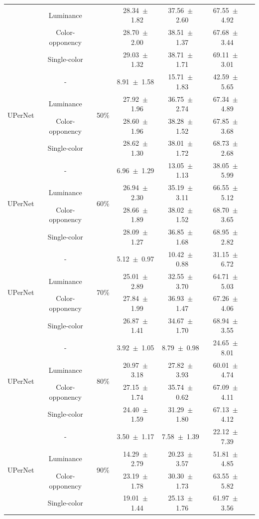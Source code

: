 \begin{table}[h]
\begin{tabular}{@{}lccc ccc@{}}
& Luminance & & 28.34~$\pm$~1.82 & 37.56~$\pm$~2.60 & 67.55~$\pm$~4.92 \\
& Color-opponency & & 28.70~$\pm$~2.00 & 38.51~$\pm$~1.37 & 67.68~$\pm$~3.44 \\
& Single-color & & 29.03~$\pm$~1.32 & 38.71~$\pm$~1.71 & 69.11~$\pm$~3.01 \\
\midrule
\multirow{4}{*}{UPerNet} & - & \multirow{4}{*}{50\%} & 8.91~$\pm$~1.58 & 15.71~$\pm$~1.83 & 42.59~$\pm$~5.65 \\
& Luminance & & 27.92~$\pm$~1.96 & 36.75~$\pm$~2.74 & 67.34~$\pm$~4.89 \\
& Color-opponency & & 28.60~$\pm$~1.96 & 38.28~$\pm$~1.52 & 67.85~$\pm$~3.68 \\
& Single-color & & 28.62~$\pm$~1.30 & 38.01~$\pm$~1.72 & 68.73~$\pm$~2.68 \\
\midrule
\multirow{4}{*}{UPerNet} & - & \multirow{4}{*}{60\%} & 6.96~$\pm$~1.29 & 13.05~$\pm$~1.13 & 38.05~$\pm$~5.99 \\
& Luminance & & 26.94~$\pm$~2.30 & 35.19~$\pm$~3.11 & 66.55~$\pm$~5.12 \\
& Color-opponency & & 28.66~$\pm$~1.89 & 38.02~$\pm$~1.52 & 68.70~$\pm$~3.65 \\
& Single-color & & 28.09~$\pm$~1.27 & 36.85~$\pm$~1.68 & 68.95~$\pm$~2.82 \\
\midrule
\multirow{4}{*}{UPerNet} & - & \multirow{4}{*}{70\%} & 5.12~$\pm$~0.97 & 10.42~$\pm$~0.88 & 31.15~$\pm$~6.72 \\
& Luminance & & 25.01~$\pm$~2.89 & 32.55~$\pm$~3.70 & 64.71~$\pm$~5.03 \\
& Color-opponency & & 27.84~$\pm$~1.99 & 36.93~$\pm$~1.47 & 67.26~$\pm$~4.06 \\
& Single-color & & 26.87~$\pm$~1.41 & 34.67~$\pm$~1.70 & 68.94~$\pm$~3.55 \\
\midrule
\multirow{4}{*}{UPerNet} & - & \multirow{4}{*}{80\%} & 3.92~$\pm$~1.05 & 8.79~$\pm$~0.98 & 24.65~$\pm$~8.01 \\
& Luminance & & 20.97~$\pm$~3.18 & 27.82~$\pm$~3.93 & 60.01~$\pm$~4.74 \\
& Color-opponency & & 27.15~$\pm$~1.74 & 35.74~$\pm$~0.62 & 67.09~$\pm$~4.11 \\
& Single-color & & 24.40~$\pm$~1.59 & 31.29~$\pm$~1.80 & 67.13~$\pm$~4.12 \\
\midrule
\multirow{4}{*}{UPerNet} & - & \multirow{4}{*}{90\%} & 3.50~$\pm$~1.17 & 7.58~$\pm$~1.39 & 22.12~$\pm$~7.39 \\
& Luminance & & 14.29~$\pm$~2.79 & 20.23~$\pm$~3.57 & 51.81~$\pm$~4.85 \\
& Color-opponency & & 23.19~$\pm$~1.78 & 30.30~$\pm$~1.73 & 63.55~$\pm$~5.82 \\
& Single-color & & 19.01~$\pm$~1.44 & 25.13~$\pm$~1.76 & 61.97~$\pm$~3.56 \\
\midrule
\bottomrule
\end{tabular}
\label{tab:sparse_results_upernet_acdc_full}
\end{table}